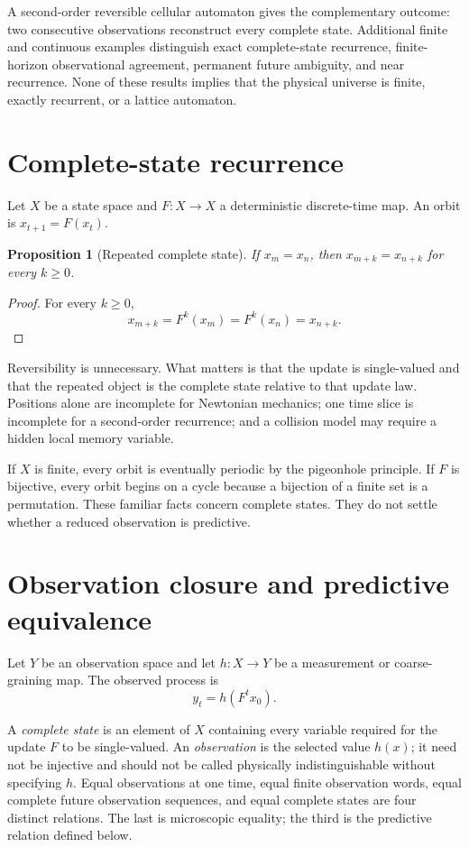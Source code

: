 \documentclass[11pt]{article}
\newtheorem{proposition}{Proposition}
\begin{document}
A second-order reversible cellular automaton gives the complementary outcome:
two consecutive observations reconstruct every complete state. Additional finite
and continuous examples distinguish exact complete-state recurrence, finite-
horizon observational agreement, permanent future ambiguity, and near
recurrence. None of these results implies that the physical universe is finite,
exactly recurrent, or a lattice automaton.

\section{Complete-state recurrence}

Let $X$ be a state space and $F:X\to X$ a deterministic discrete-time map. An
orbit is $x_{t+1}=F(x_t)$.

\begin{proposition}[Repeated complete state]
If $x_m=x_n$, then $x_{m+k}=x_{n+k}$ for every $k\geq0$.
\end{proposition}

\begin{proof}
For every $k\geq0$,
\[
x_{m+k}=F^k(x_m)=F^k(x_n)=x_{n+k}.
\]
\end{proof}

Reversibility is unnecessary. What matters is that the update is single-valued
and that the repeated object is the complete state relative to that update law.
Positions alone are incomplete for Newtonian mechanics; one time slice is
incomplete for a second-order recurrence; and a collision model may require a
hidden local memory variable.

If $X$ is finite, every orbit is eventually periodic by the pigeonhole principle.
If $F$ is bijective, every orbit begins on a cycle because a bijection of a finite
set is a permutation. These familiar facts concern complete states. They do not
settle whether a reduced observation is predictive.

\section{Observation closure and predictive equivalence}

Let $Y$ be an observation space and let $h:X\to Y$ be a measurement or
coarse-graining map. The observed process is
\[
y_t=h(F^t x_0).
\]

A \emph{complete state} is an element of $X$ containing every variable required
for the update $F$ to be single-valued. An \emph{observation} is the selected
value $h(x)$; it need not be injective and should not be called physically
indistinguishable without specifying $h$. Equal observations at one time, equal
finite observation words, equal complete future observation sequences, and equal
complete states are four distinct relations. The last is microscopic equality;
the third is the predictive relation defined below.
\end{document}
